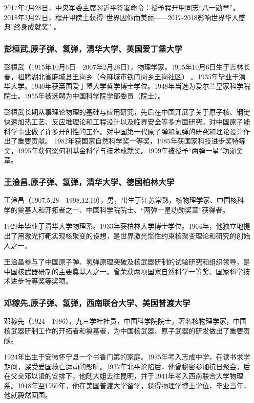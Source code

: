 \documentclass[UTF8]{ctexart}
\begin{document}
2017年7月28日，中央军委主席习近平签署命令：授予程开甲同志“八一勋章”。 2018年3月27日，程开甲院士获得“世界因你而美丽——2017-2018影响世界华人盛典”终身成就奖”  。
    \subsubsection{彭桓武,原子弹、氢弹，清华大学、英国爱丁堡大学}

彭桓武（1915年10月6日—2007年2月28日），物理学家。1915年10月6日生于吉林长春，祖籍湖北省麻城县王岗乡（今麻城市铁门岗乡王岗社区） 。1935年毕业于清华大学。1940年获英国爱丁堡大学哲学博士学位。1948年当选为爱尔兰皇家科学院院士。1955年被选聘为中国科学院学部委员（院士）。

彭桓武长期从事理论物理的基础与应用研究，先后在中国开展了关于原子核、钢锭快速加热工艺、反应堆理论和工程设计以及临界安全等多方面研究。对中国原子能科学事业做了许多开创性的工作。对中国第一代原子弹和氢弹的研究和理论设计作出了重要贡献。 1982年获国家自然科学奖一等奖，1985年获国家科技进步奖特等奖，1995年获何梁何利基金科学与技术成就奖。1999年被授予“两弹一星”功勋奖章。

    \subsubsection{王淦昌,原子弹、氢弹，清华大学、德国柏林大学}
王淦昌（1907.5.28—1998.12.10），男，出生于江苏常熟，核物理学家、中国核科学的奠基人和开拓者之一、中国科学院院士、“两弹一星功勋奖章”获得者。


1929年毕业于清华大学物理系。1933年获柏林大学博士学位。1964年，他独立地提出了用激光打靶实现核聚变的设想，是世界激光惯性约束核聚变理论和研究的创始人之一。

王淦昌参与了中国原子弹、氢弹原理突破及核武器研制的试验研究和组织领导，是中国核武器研制的主要奠基人之一。曾荣获两项国家自然科学一等奖、国家科学技术进步特等奖等奖项。

    \subsubsection{邓稼先,原子弹、氢弹，西南联合大学、美国普渡大学}
邓稼先（1924—1986），九三学社社员，中国科学院院士，著名核物理学家，中国核武器研制工作的开拓者和奠基者，为中国核武器、原子武器的研发做出了重要贡献。

1924年出生于安徽怀宁县一个书香门第的家庭。1935年考入志成中学，在读书求学期间，深受爱国救亡运动的影响。1937年北平沦陷后，他曾秘密参加抗日聚会。后在父亲邓以蛰的安排下，他随大姐去往昆明，并于1941年考入西南联合大学物理系。1948年至1950年，他在美国普渡大学留学，获得物理学博士学位，毕业当年，他就毅然回国。 
\end{document}
